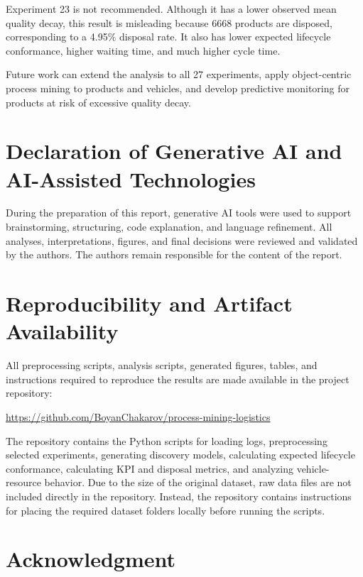 \documentclass[conference]{IEEEtran}
\begin{document}
Experiment 23 is not recommended. Although it has a lower observed mean quality decay, this result is misleading because 6668 products are disposed, corresponding to a 4.95\% disposal rate. It also has lower expected lifecycle conformance, higher waiting time, and much higher cycle time.

Future work can extend the analysis to all 27 experiments, apply object-centric process mining to products and vehicles, and develop predictive monitoring for products at risk of excessive quality decay.

\section*{Declaration of Generative AI and AI-Assisted Technologies}

During the preparation of this report, generative AI tools were used to support brainstorming, structuring, code explanation, and language refinement. All analyses, interpretations, figures, and final decisions were reviewed and validated by the authors. The authors remain responsible for the content of the report.

\section*{Reproducibility and Artifact Availability}

All preprocessing scripts, analysis scripts, generated figures, tables, and instructions required to reproduce the results are made available in the project repository:

\begin{center}
\url{https://github.com/BoyanChakarov/process-mining-logistics}
\end{center}

The repository contains the Python scripts for loading logs, preprocessing selected experiments, generating discovery models, calculating expected lifecycle conformance, calculating KPI and disposal metrics, and analyzing vehicle-resource behavior. Due to the size of the original dataset, raw data files are not included directly in the repository. Instead, the repository contains instructions for placing the required dataset folders locally before running the scripts.

\section*{Acknowledgment}
\end{document}
